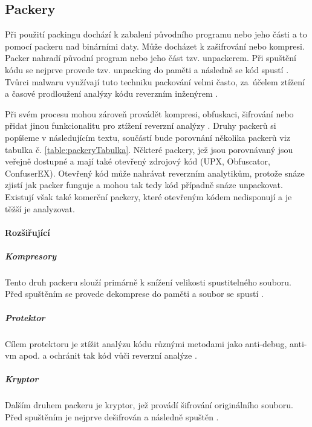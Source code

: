 \subsection{Packery}
\label{packers}

Při použití packingu dochází k zabalení původního programu nebo jeho části a to pomocí packeru nad binárními daty. Může docházet k zašifrování nebo kompresi. Packer nahradí původní program nebo jeho část tzv. unpackerem. Při spuštění kódu se nejprve provede tzv. unpacking do paměti a následně se kód spustí \cite{diff_packers}. Tvůrci malwaru využívají tuto techniku packování velmi často, za~účelem ztížení a časové prodloužení analýzy kódu reverzním inženýrem \cite{HoonKang2011}.



Při svém procesu mohou zároveň provádět kompresi, obfuskaci, šifrování nebo přidat jinou funkcionalitu pro ztížení reverzní analýzy \cite{packers_2010}. Druhy packerů si popíšeme v následujícím textu, součástí bude porovnání několika packerů viz tabulka č. \ref{table:packeryTabulka}. Některé packery, jež jsou porovnávaný jsou veřejně dostupné a mají také otevřený zdrojový kód (UPX, Obfuscator, ConfuserEX). Otevřený kód může nahrávat reverzním analytikům, protože snáze zjistí jak packer funguje a mohou tak tedy kód případně snáze unpackovat. Existují však také komerční packery, které otevřeným kódem nedisponují a je těžší je analyzovat.


\paragraph*{Rozšiřující}

\subparagraph*{Kompresory} Tento druh packeru slouží primárně k snížení velikosti spustitelného souboru. Před spuštěním se provede dekomprese do paměti a soubor se spustí \cite{diff_packers}.

\subparagraph*{Protektor} Cílem protektoru je ztížit analýzu kódu různými metodami jako anti-debug, anti-vm apod. a ochránit tak kód vůči reverzní analýze \cite{packers-malwarbytes}.

\subparagraph*{Kryptor}  Dalším druhem packeru je kryptor, jež provádí šifrování originálního souboru. Před spuštěním je nejprve dešifrován a následně spuštěn \cite{packers-malwarbytes}.

